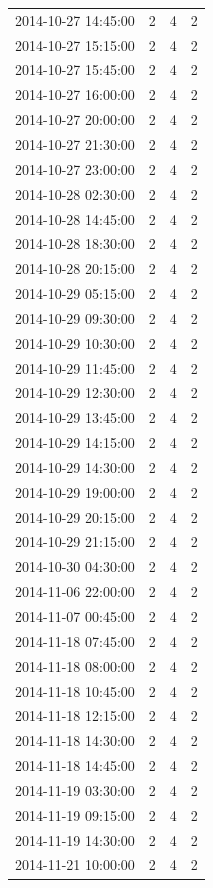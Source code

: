 \begin{tabular}{lrrr}
2014-10-27 14:45:00 & 2 & 4 & 2 \\
2014-10-27 15:15:00 & 2 & 4 & 2 \\
2014-10-27 15:45:00 & 2 & 4 & 2 \\
2014-10-27 16:00:00 & 2 & 4 & 2 \\
2014-10-27 20:00:00 & 2 & 4 & 2 \\
2014-10-27 21:30:00 & 2 & 4 & 2 \\
2014-10-27 23:00:00 & 2 & 4 & 2 \\
2014-10-28 02:30:00 & 2 & 4 & 2 \\
2014-10-28 14:45:00 & 2 & 4 & 2 \\
2014-10-28 18:30:00 & 2 & 4 & 2 \\
2014-10-28 20:15:00 & 2 & 4 & 2 \\
2014-10-29 05:15:00 & 2 & 4 & 2 \\
2014-10-29 09:30:00 & 2 & 4 & 2 \\
2014-10-29 10:30:00 & 2 & 4 & 2 \\
2014-10-29 11:45:00 & 2 & 4 & 2 \\
2014-10-29 12:30:00 & 2 & 4 & 2 \\
2014-10-29 13:45:00 & 2 & 4 & 2 \\
2014-10-29 14:15:00 & 2 & 4 & 2 \\
2014-10-29 14:30:00 & 2 & 4 & 2 \\
2014-10-29 19:00:00 & 2 & 4 & 2 \\
2014-10-29 20:15:00 & 2 & 4 & 2 \\
2014-10-29 21:15:00 & 2 & 4 & 2 \\
2014-10-30 04:30:00 & 2 & 4 & 2 \\
2014-11-06 22:00:00 & 2 & 4 & 2 \\
2014-11-07 00:45:00 & 2 & 4 & 2 \\
2014-11-18 07:45:00 & 2 & 4 & 2 \\
2014-11-18 08:00:00 & 2 & 4 & 2 \\
2014-11-18 10:45:00 & 2 & 4 & 2 \\
2014-11-18 12:15:00 & 2 & 4 & 2 \\
2014-11-18 14:30:00 & 2 & 4 & 2 \\
2014-11-18 14:45:00 & 2 & 4 & 2 \\
2014-11-19 03:30:00 & 2 & 4 & 2 \\
2014-11-19 09:15:00 & 2 & 4 & 2 \\
2014-11-19 14:30:00 & 2 & 4 & 2 \\
2014-11-21 10:00:00 & 2 & 4 & 2 \\

\end{tabular}
